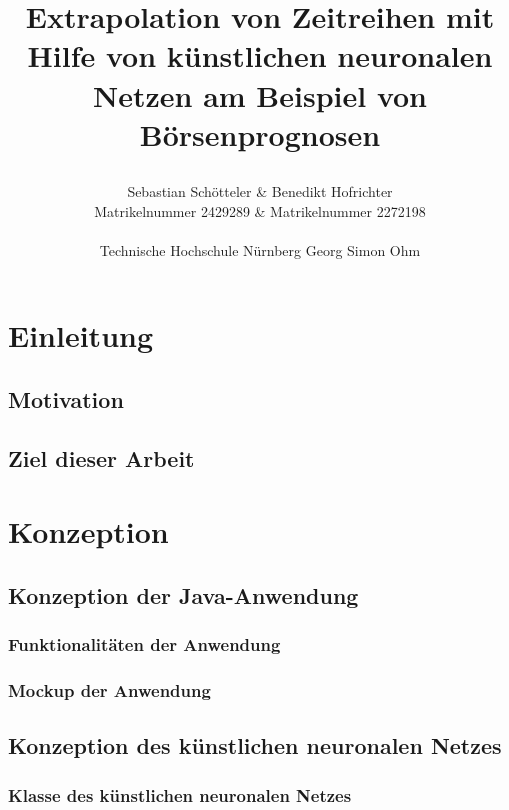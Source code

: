 \documentclass[11pt,a4paper]{scrreprt}
\begin{document}
\title
{
\bf Extrapolation von Zeitreihen mit Hilfe von künstlichen neuronalen Netzen am Beispiel von Börsenprognosen
\author
{
	Sebastian Schötteler \& Benedikt Hofrichter \\
	Matrikelnummer 2429289 \& Matrikelnummer 2272198 \\\\ 
	Technische Hochschule Nürnberg Georg Simon Ohm \\
}
}

\maketitle


\tableofcontents

\chapter{Einleitung}
 \section{Motivation}
 \section{Ziel dieser Arbeit}

\chapter{Konzeption} %
	\section{Konzeption der Java-Anwendung} %
		\subsection{Funktionalitäten der Anwendung} %
		\subsection{Mockup der Anwendung} %
	\section{Konzeption des künstlichen neuronalen Netzes} %
		\subsection{Klasse des künstlichen neuronalen Netzes} %
\end{document}
